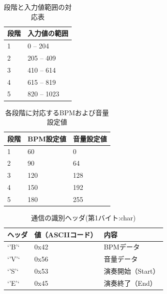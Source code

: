\documentclass[lualatex,book,paper=a4paper,jafontsize=11.5pt,jafontscale=1.05]{jlreq}
\begin{document}
\begin{table}[H]
    \centering
    \caption{段階と入力値範囲の対応表}
    \label{tab:range}
    \begin{tabular}{ll}
    \hline
    \textbf{段階} & \textbf{入力値の範囲} \\ \hline
    1 & 0 -- 204 \\ \hline
    2 & 205 -- 409 \\ \hline
    3 & 410 -- 614 \\ \hline
    4 & 615 -- 819 \\ \hline
    5 & 820 -- 1023 \\ \hline
    \end{tabular}
\end{table}

\begin{table}[H]
    \centering
    \caption{各段階に対応するBPMおよび音量設定値}
    \label{tab:bpm_volume}
    \begin{tabular}{lll}
    \hline
    \textbf{段階} & \textbf{BPM設定値} & \textbf{音量設定値} \\ \hline
    1 & 60 & 0 \\ \hline
    2 & 90 & 64 \\ \hline
    3 & 120 & 128 \\ \hline
    4 & 150 & 192 \\ \hline
    5 & 180 & 255 \\ \hline
    \end{tabular}
\end{table}

\begin{table}[H]
    \centering
    \caption{通信の識別ヘッダ(第1バイト:char)}
    \label{tab:hed}
    \begin{tabular}{lll}
    \hline
    \textbf{ヘッダ} & \textbf{値（ASCIIコード）} & \textbf{内容} \\ \hline
    `'B'` & 0x42 & BPMデータ \\ \hline
    `'V'` & 0x56 & 音量データ \\ \hline
    `'S'` & 0x53 & 演奏開始（Start） \\ \hline
    `'E'` & 0x45 & 演奏終了（End） \\ \hline
    \end{tabular}
\end{table}
\end{document}
